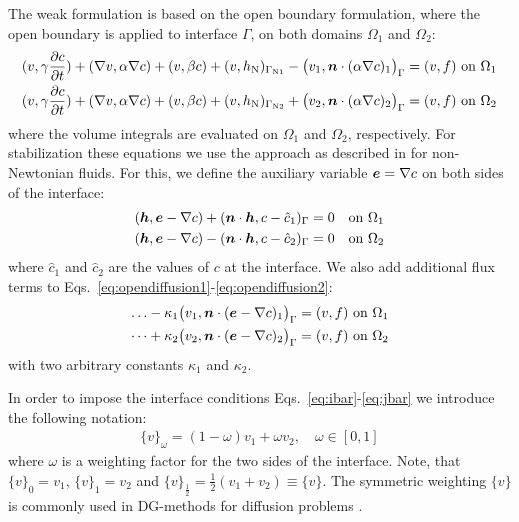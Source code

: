 The weak formulation is based on the open boundary formulation, where the open
boundary is applied to interface $\Gamma$, on both domains $\Omega_1$ and
$\Omega_2$:
\begin{align}
   (v,\gamma\dfrac{\partial c}{\partial t})
   +(\nabla v,\alpha\nabla c) + (v,\beta c)
             + (v,h_{\text{N}})_{\Gamma_{\text{N1}}}
            -\big(v_1,\boldsymbol{n}\cdot(\alpha\nabla c)_1\big)_{\Gamma}
              &=(v,f)\text{ on }\Omega_1
   \label{eq:opendiffusion1}\\
   (v,\gamma\dfrac{\partial c}{\partial t})
   +(\nabla v,\alpha\nabla c) + (v,\beta c)
             + (v,h_{\text{N}})_{\Gamma_{\text{N2}}}
            +\big(v_2,\boldsymbol{n}\cdot(\alpha\nabla c)_2\big)_{\Gamma}
              &=(v,f)\text{ on }\Omega_2
   \label{eq:opendiffusion2}
\end{align}
where 
the volume integrals are evaluated on $\Omega_1$ and 
$\Omega_2$, respectively. For stabilization these equations
we use the approach as
described in \cite{Choi11} for non-Newtonian fluids. For this, we define the
auxiliary variable $\boldsymbol{e}=\nabla c$ on both sides of the interface:
\begin{align}
   (\boldsymbol{h},\boldsymbol{e}-\nabla c) + (\boldsymbol{n}\cdot\boldsymbol{h},c-\hat c_1)_\Gamma =
       0\quad\text{on }\Omega_1 \label{eq:stabdiffusion1}\\
   (\boldsymbol{h},\boldsymbol{e}-\nabla c) - (\boldsymbol{n}\cdot\boldsymbol{h},c-\hat c_2)_\Gamma =
       0\quad\text{on }\Omega_2 \label{eq:stabdiffusion2}
\end{align}
where $\hat c_1$ and $\hat c_2$ are the values of $c$ at the interface.
We also add additional flux terms to
 Eqs.~\eqref{eq:opendiffusion1}-\eqref{eq:opendiffusion2}:
\begin{align}
  \ldots -\kappa_1\big(v_1,\boldsymbol{n}\cdot(\boldsymbol{e} -\nabla c)_1\big)_{\Gamma}
              &=(v,f)\text{ on }\Omega_1
   \label{eq:stabdiffusion3}\\
   \dots +\kappa_2\big(v_2,\boldsymbol{n}\cdot(\boldsymbol{e}- \nabla c)_2\big)_{\Gamma}
              &=(v,f)\text{ on }\Omega_2
   \label{eq:stabdiffusion4}
\end{align}
with two arbitrary constants $\kappa_1$ and $\kappa_2$.

In order to impose the interface conditions
Eqs.~\eqref{eq:ibar}-\eqref{eq:jbar} we introduce the following notation:
\begin{align}
   \{v\}_\omega=(1-\omega)v_1+\omega v_2,\quad \omega\in[0,1]
\end{align}
where $\omega$ is a weighting factor for the two sides of the interface.
Note, that $\{v\}_0=v_1$, $\{v\}_1=v_2$ and
$\{v\}_\frac12=\frac12(v_1+v_2)\equiv\{v\}$. The symmetric weighting $\{v\}$ is
commonly used in DG-methods for diffusion problems \cite{Arnold02}.

